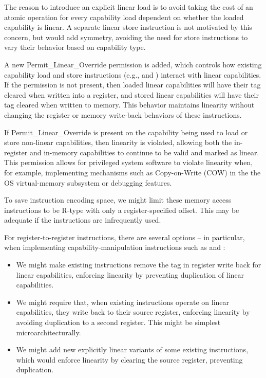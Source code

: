 The reason to introduce an explicit
linear
load is to avoid taking the cost of an
atomic operation for every capability load dependent on whether the loaded
capability is linear.
%
%
A separate linear store instruction is not motivated by this concern, but
would add
symmetry, avoiding the need for store instructions to vary their behavior
based on capability type.

A new Permit\_Linear\_Override permission is added, which controls how
existing capability load and store instructions (e.g.,  and
) interact with linear capabilities.
If the permission is not present, then loaded linear capabilities will have
their tag cleared when written into a register, and stored linear
capabilities will have their tag cleared when written to memory.
This behavior maintains linearity without changing the register or memory
write-back behaviors of these instructions.

If Permit\_Linear\_Override is present on the capability being used to load or
store non-linear capabilities, then linearity is violated, allowing both the
in-register and in-memory capabilities to continue to be valid and marked as
linear.
This permission allows for privileged system software to violate linearity
when, for example, implementing mechanisms such as Copy-on-Write (COW) in the
the OS virtual-memory subsystem or debugging features.

To save instruction encoding space, we might limit these memory access
instructions to be R-type with only a register-specified offset.  This
may be adequate if the instructions are infrequently used.

For register-to-register instructions, there are several options -- in
particular, when implementing capability-manipulation instructions such as
 and :

\begin{itemize}
\item We might make existing instructions remove the tag in register write
  back for linear capabilities, enforcing linearity by preventing duplication
  of linear capabilities.

\item We might require that, when existing instructions operate on linear
  capabilities, they write back to their source register, enforcing linearity
  by avoiding duplication to a second register.  This might be
  simplest microarchitecturally.

\item We might add new explicitly linear variants of some existing
  instructions, which would enforce linearity by clearing the source register,
  preventing duplication.
\end{itemize}

